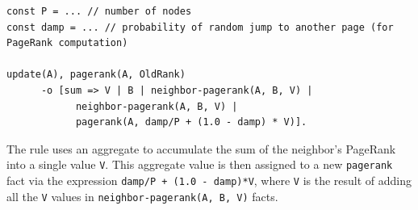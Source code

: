\begin{Verbatim}[fontsize=\scriptsize]
const P = ... // number of nodes
const damp = ... // probability of random jump to another page (for PageRank computation)

update(A), pagerank(A, OldRank)
      -o [sum => V | B | neighbor-pagerank(A, B, V) |
            neighbor-pagerank(A, B, V) |
            pagerank(A, damp/P + (1.0 - damp) * V)].
\end{Verbatim}

The rule uses an aggregate to accumulate the sum of the neighbor's PageRank into
a single value \texttt{V}. This aggregate value is then assigned to a new
\texttt{pagerank} fact via the expression \texttt{damp/P + (1.0 - damp)*V},
where \texttt{V} is the result of adding all the \texttt{V} values in
\texttt{neighbor-pagerank(A, B, V)} facts.
